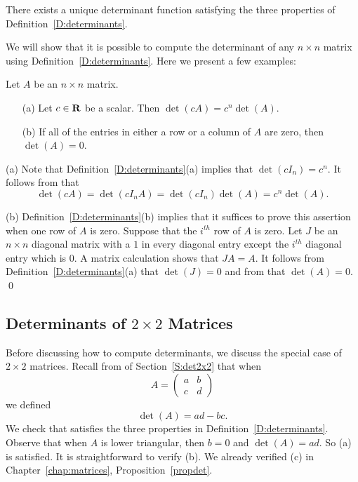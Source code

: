 \documentclass{ximera}
\begin{document}
\begin{thm}  \label{T:determinants}
There exists a unique determinant function satisfying the three
properties of Definition~\ref{D:determinants}.
\end{thm}

We will show that it is possible to compute the determinant of
any $n\times n$ matrix using Definition~\ref{D:determinants}.
Here we present a few examples:

\begin{lemma}
Let $A$ be an $n\times n$ matrix.
\begin{itemize}
\item[(a)]   Let $c\in\mbox{$\bf{R}$}$ be a scalar.  Then $\det(cA) = c^n\det(A)$.
\item[(b)] If all of the entries in either a row or a column of $A$ are 
zero, then $\det(A)=0$.
\end{itemize}
\end{lemma}

\proof  (a) Note that Definition~\ref{D:determinants}(a) implies that 
$\det(cI_n)=c^n$.  It follows from  that
\[
\det(cA) = \det(cI_n A) = \det(cI_n)\det(A) = c^n\det(A).
\]

(b)  Definition~\ref{D:determinants}(b) implies that it suffices to prove 
this assertion when one row of $A$ is zero.  Suppose that the $i^{th}$ row 
of $A$ is zero.  Let $J$ be an $n\times n$ 
diagonal matrix with a $1$ in every diagonal entry except the $i^{th}$ 
diagonal entry which is $0$.  A matrix calculation shows that $JA=A$. 
It follows from Definition~\ref{D:determinants}(a) that $\det(J)=0$ and 
from  that $\det(A)=0$.  \qed 



\subsection*{Determinants of $2\times 2$ Matrices}
 
Before discussing how to compute determinants, we discuss the
special case of $2\times 2$ matrices.  Recall from  of 
Section~\ref{S:det2x2} that when 
\[
A=\left(\begin{array}{cc} a & b\\c & d \end{array}\right)
\]
we defined 
\begin{equation}  \label{e:determinantn=2}
\det(A)=ad-bc.
\end{equation}
We check that  satisfies the three
properties in Definition~\ref{D:determinants}.  Observe that when
$A$ is lower triangular, then $b=0$ and $\det(A)=ad$.  So (a) is
satisfied.  It is straightforward to verify (b).  We already
verified (c) in Chapter~\ref{chap:matrices}, Proposition~\ref{propdet}.
\end{document}

